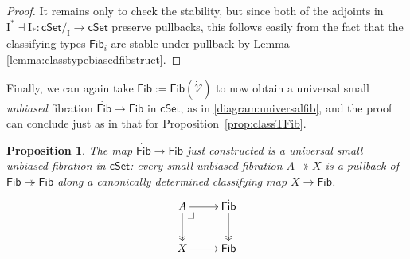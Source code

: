 \documentclass[11pt]{amsart}
\makeatletter
\newcommand{\FF}{\ensuremath{\mathcal{F}}}
\newcommand{\EE}{\ensuremath{\mathcal{E}}}
\newcommand{\cSet}{\ensuremath{\mathsf{cSet}}}
\newcommand{\ra}{\ensuremath{\rightarrow}}
\newcommand{\fib}{\ensuremath{\twoheadrightarrow}}
\renewcommand{\to}{\ensuremath{\rightarrow}}
\newcommand{\I}{\ensuremath{\mathrm{I}}}
\newcommand{\U}{\ensuremath{\mathcal{U}}}
\newcommand{\UU}{\ensuremath{\,\dot{\mathcal{U}}}}
\newcommand{\VV}{\ensuremath{\dot{\mathcal{V}}}}
\newcommand{\Fib}{\ensuremath{\mathsf{Fib}}}
\newcommand{\FFib}{\ensuremath{\dot{\mathsf{Fib}}}}
\newtheorem{proposition}[theorem]{Proposition}
\theoremstyle{remark}
\theoremstyle{definition}
\newtheorem{definition}[theorem]{Definition}
\newcommand{\pbcorner}[1][dr]{\save*!/#1-1.2pc/#1:(-1,1)@^{|-}\restore}
\makeatother
\begin{document}
\begin{proof} It remains only to check the stability, but since both of the adjoints in $\I^* \dashv \I_* : \cSet/_\I \ra\cSet$ preserve pullbacks, this follows easily from the fact that the classifying types $\Fib_i$ are stable under pullback by Lemma \ref{lemma:classtypebiasedfibstruct}.
\end{proof}

%


Finally, we can again take $\Fib := \Fib(\VV)$ to now obtain a universal small \emph{unbiased} fibration $\FFib\ra\Fib$ in $\cSet$, as in \eqref{diagram:universalfib}, and the proof can conclude just as in that for Proposition~\ref{prop:classTFib}.  

\begin{proposition}\label{prop:UniversalunbiasedFib}
The map $\FFib\ra\Fib$ just constructed is a \emph{universal small unbiased fibration} in $\cSet$: every small unbiased fibration $A \fib X$ is a pullback of $\FFib \fib \Fib$ along a canonically determined classifying map $X\ra \Fib$.
\begin{equation}\label{diagram:classifyfib}
\xymatrix{
A \ar@{>>}[d] \ar[r]  \pbcorner & \FFib \ar@{>>}[d] \\
X \ar[r] & \Fib
}
\end{equation}
\end{proposition}

\end{document}
